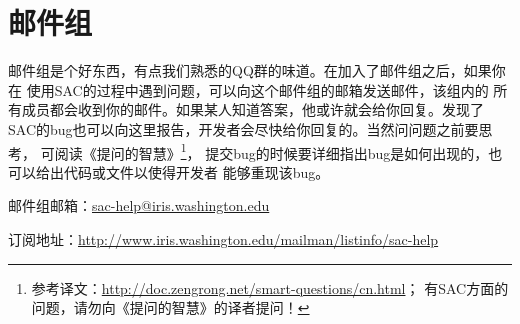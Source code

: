 \section{邮件组}
邮件组是个好东西，有点我们熟悉的QQ群的味道。在加入了邮件组之后，如果你在
使用SAC的过程中遇到问题，可以向这个邮件组的邮箱发送邮件，该组内的
所有成员都会收到你的邮件。如果某人知道答案，他或许就会给你回复。发现了
SAC的bug也可以向这里报告，开发者会尽快给你回复的。当然问问题之前要思考，
可阅读《提问的智慧》\footnote{参考译文：\url{http://doc.zengrong.net/smart-questions/cn.html}；
有SAC方面的问题，请勿向《提问的智慧》的译者提问！}，
提交bug的时候要详细指出bug是如何出现的，也可以给出代码或文件以使得开发者
能够重现该bug。

邮件组邮箱：\url{sac-help@iris.washington.edu}

订阅地址：\small{\url{http://www.iris.washington.edu/mailman/listinfo/sac-help}}
